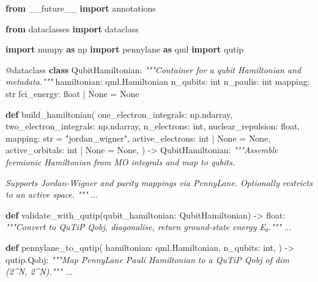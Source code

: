 \documentclass[
  11pt,
]{report}
\newenvironment{Shaded}{}{}
\newcommand{\AttributeTok}[1]{\textcolor[rgb]{0.49,0.56,0.16}{#1}}
\newcommand{\BuiltInTok}[1]{\textcolor[rgb]{0.00,0.50,0.00}{#1}}
\newcommand{\CommentTok}[1]{\textcolor[rgb]{0.38,0.63,0.69}{\textit{#1}}}
\newcommand{\ImportTok}[1]{\textcolor[rgb]{0.00,0.50,0.00}{\textbf{#1}}}
\newcommand{\KeywordTok}[1]{\textcolor[rgb]{0.00,0.44,0.13}{\textbf{#1}}}
\newcommand{\NormalTok}[1]{#1}
\newcommand{\OperatorTok}[1]{\textcolor[rgb]{0.40,0.40,0.40}{#1}}
\newcommand{\StringTok}[1]{\textcolor[rgb]{0.25,0.44,0.63}{#1}}
\newcommand{\VariableTok}[1]{\textcolor[rgb]{0.10,0.09,0.49}{#1}}
\begin{document}
\begin{Shaded}
\begin{Highlighting}[]
\ImportTok{from}\NormalTok{ \_\_future\_\_ }\ImportTok{import}\NormalTok{ annotations}

\ImportTok{from}\NormalTok{ dataclasses }\ImportTok{import}\NormalTok{ dataclass}

\ImportTok{import}\NormalTok{ numpy }\ImportTok{as}\NormalTok{ np}
\ImportTok{import}\NormalTok{ pennylane }\ImportTok{as}\NormalTok{ qml}
\ImportTok{import}\NormalTok{ qutip}


\AttributeTok{@dataclass}
\KeywordTok{class}\NormalTok{ QubitHamiltonian:}
    \CommentTok{"""Container for a qubit Hamiltonian and metadata."""}
\NormalTok{    hamiltonian: qml.Hamiltonian}
\NormalTok{    n\_qubits: }\BuiltInTok{int}
\NormalTok{    n\_paulis: }\BuiltInTok{int}
\NormalTok{    mapping: }\BuiltInTok{str}
\NormalTok{    fci\_energy: }\BuiltInTok{float} \OperatorTok{|} \VariableTok{None} \OperatorTok{=} \VariableTok{None}


\KeywordTok{def}\NormalTok{ build\_hamiltonian(}
\NormalTok{    one\_electron\_integrals: np.ndarray,}
\NormalTok{    two\_electron\_integrals: np.ndarray,}
\NormalTok{    n\_electrons: }\BuiltInTok{int}\NormalTok{,}
\NormalTok{    nuclear\_repulsion: }\BuiltInTok{float}\NormalTok{,}
\NormalTok{    mapping: }\BuiltInTok{str} \OperatorTok{=} \StringTok{"jordan\_wigner"}\NormalTok{,}
\NormalTok{    active\_electrons: }\BuiltInTok{int} \OperatorTok{|} \VariableTok{None} \OperatorTok{=} \VariableTok{None}\NormalTok{,}
\NormalTok{    active\_orbitals: }\BuiltInTok{int} \OperatorTok{|} \VariableTok{None} \OperatorTok{=} \VariableTok{None}\NormalTok{,}
\NormalTok{) }\OperatorTok{{-}\textgreater{}}\NormalTok{ QubitHamiltonian:}
    \CommentTok{"""Assemble fermionic Hamiltonian from MO integrals and map to qubits.}

\CommentTok{    Supports Jordan{-}Wigner and parity mappings via PennyLane.}
\CommentTok{    Optionally restricts to an active space.}
\CommentTok{    """}
\NormalTok{    ...}


\KeywordTok{def}\NormalTok{ validate\_with\_qutip(qubit\_hamiltonian: QubitHamiltonian) }\OperatorTok{{-}\textgreater{}} \BuiltInTok{float}\NormalTok{:}
    \CommentTok{"""Convert to QuTiP Qobj, diagonalise, return ground{-}state energy E₀."""}
\NormalTok{    ...}


\KeywordTok{def}\NormalTok{ pennylane\_to\_qutip(}
\NormalTok{    hamiltonian: qml.Hamiltonian,}
\NormalTok{    n\_qubits: }\BuiltInTok{int}\NormalTok{,}
\NormalTok{) }\OperatorTok{{-}\textgreater{}}\NormalTok{ qutip.Qobj:}
    \CommentTok{"""Map PennyLane Pauli Hamiltonian to a QuTiP Qobj of dim (2\^{}N, 2\^{}N)."""}
\NormalTok{    ...}
\end{Highlighting}
\end{Shaded}
\end{document}

